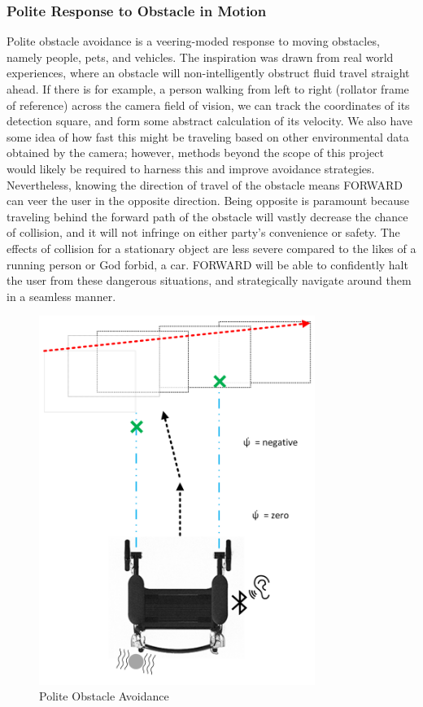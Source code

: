 \subsubsection{Polite Response to Obstacle in Motion}
\noindent Polite obstacle avoidance is a veering-moded response to moving obstacles, namely people, pets, and vehicles. The inspiration was drawn from real world experiences, where an obstacle will non-intelligently obstruct fluid travel straight ahead. If there is for example, a person walking from left to right (rollator frame of reference) across the camera field of vision, we can track the coordinates of its detection square, and form some abstract calculation of its velocity. We also have some idea of how fast this might be traveling based on other environmental data obtained by the camera; however, methods beyond the scope of this project would likely be required to harness this and improve avoidance strategies. Nevertheless, knowing the direction of travel of the obstacle means FORWARD can veer the user in the opposite direction. Being opposite is paramount because traveling behind the forward path of the obstacle will vastly decrease the chance of collision, and it will not infringe on either party's convenience or safety. The effects of collision for a stationary object are less severe compared to the likes of a running person or God forbid, a car. FORWARD will be able to confidently halt the user from these dangerous situations, and strategically navigate around them in a seamless manner.\\
\begin{figure}[H]
	\centering
	\includegraphics[width=0.8\textwidth]{./Images/Polite-Mobile-Obstacle-Avoidance.png}
	\caption{\label{fig:polite}Polite Obstacle Avoidance}
\end{figure}
